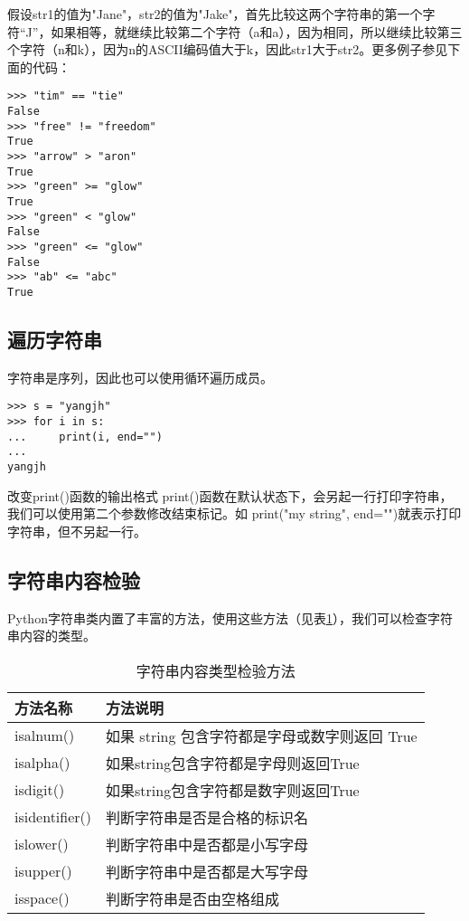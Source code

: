 假设str1的值为"Jane"，str2的值为"Jake"，首先比较这两个字符串的第一个字符“J”，如果相等，就继续比较第二个字符（a和a），因为相同，所以继续比较第三个字符（n和k），因为n的ASCII编码值大于k，因此str1大于str2。更多例子参见下面的代码：

\begin{lstlisting}
>>> "tim" == "tie"
False
>>> "free" != "freedom"
True
>>> "arrow" > "aron"
True
>>> "green" >= "glow"
True
>>> "green" < "glow"
False
>>> "green" <= "glow"
False
>>> "ab" <= "abc"
True
\end{lstlisting}

\subsection{遍历字符串}

字符串是序列，因此也可以使用循环遍历成员。

\begin{lstlisting}
>>> s = "yangjh"
>>> for i in s:
...     print(i, end="")
...
yangjh
\end{lstlisting}

\begin{myremark}{改变print()函数的输出格式}
print()函数在默认状态下，会另起一行打印字符串，我们可以使用第二个参数修改结束标记。如
print("my string", end="")就表示打印字符串，但不另起一行。
\end{myremark}

\subsection{字符串内容检验}

Python字符串类内置了丰富的方法，使用这些方法（见表\ref{tab:字符串内容检验}），我们可以检查字符串内容的类型。

\begin{table}[ht]
  \centering
  \caption{字符串内容类型检验方法}
    \begin{tabular}{ll}
    \toprule
    \textbf{方法名称} & \textbf{方法说明} \\
    \midrule
    isalnum() 			& 如果 string 包含字符都是字母或数字则返回 True \\
    isalpha() 			& 如果string包含字符都是字母则返回True \\
    isdigit() 			& 如果string包含字符都是数字则返回True \\
    isidentifier() 	& 判断字符串是否是合格的标识名 \\
    islower() 			& 判断字符串中是否都是小写字母 \\
    isupper() 			& 判断字符串中是否都是大写字母 \\
    isspace() 			& 判断字符串是否由空格组成 \\
    \bottomrule
    \end{tabular}%
  \label{tab:字符串内容检验}%
\end{table}%

